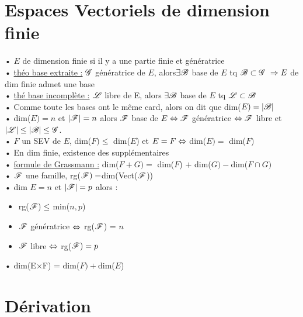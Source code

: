 \documentclass[12 pt]{book}
\begin{document}
\section*{Espaces Vectoriels de dimension finie}

\begin{flushleft}
\begin{doublespace}

	• $E$ de dimension finie si il y a une partie finie et génératrice\\
	• \underline{théo base extraite :} $\mathscr{G}$ génératrice de $E$, alors$\exists \mathscr{B}$  base de $E$ tq $\mathscr{B} \subset \mathscr{G} \ \Rightarrow E$ de dim finie admet une base\\
	• \underline{thé base incomplète :} $\mathscr{L}$ libre de E, alors $\exists \mathscr{B}$ base de $E$ tq $\mathscr{L} \subset \mathscr{B}$\\
	• Comme toute les bases ont le même card, alors on dit que dim($E) = |\mathscr{B}|$\\
	• dim($E) = n$ et $|\mathscr{F}| = n$ alors $\mathscr{F}$ base de $E \Leftrightarrow \mathscr{F}$ génératrice $\Leftrightarrow \mathscr{F}$ libre et $|\mathscr{L}| \leq |\mathscr{B}| \leq \mathscr{G}$.\\
	• $F$ un SEV de $E$, dim($F) \leq$ dim($E$) et $E=F \Leftrightarrow$ dim($E) =$ dim($F$)\\
	• En dim finie, existence des supplémentaires\\
	• \underline{formule de Grassmann :} dim($F+G) =$ dim($F$) $+$ dim($G) - $dim($F\cap G)$\\
	• $\mathscr{F}$ une famille, rg($\mathscr{F}) = $dim(Vect($\mathscr{F}$))\\
	• dim $E = n$ et $|\mathscr{F}| = p$ alors : 
	\quad \begin{itemize}
			\item rg($\mathscr{F}) \leq$ min($n,p$)
			\item $\mathscr{F}$ génératrice $\Leftrightarrow$ rg($\mathscr{F}$) = $n$
			\item $\mathscr{F}$ libre $\Leftrightarrow$ rg($\mathscr{F}) = p$
		\end{itemize}
	• dim(E$\times$F) = dim($F) + $dim($E$)\\

\end{doublespace}
\end{flushleft}

\section*{Dérivation}
\end{document}
